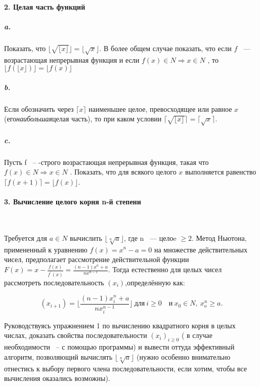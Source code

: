 \documentclass{mai_book}
\begin{document}
\newpage



\paragraph { 2. Целая часть функций}

\subparagraph { a.} Показать, что $\lfloor\sqrt{\lfloor {x }\rfloor}\rfloor=
\lfloor\sqrt{x}\rfloor$. В более общем случае показать, что если $f$ ~--- возрастающая непрерывная функция и если $f\left(x\right)\in{ N }\Rightarrow {x\in {N}}$ , то $\lfloor {f\left(\lfloor {x}\rfloor\right)}\rfloor=\lfloor{ f\left({x}\right)}\rfloor$

\subparagraph { b.} Если обозначить через $\lceil{x}\rceil$ наименьшее целое, превосходящее или равное $x$ (его{\it наибольшая}целая часть), то при каком условии $\lceil{\sqrt{\lfloor {x}\rfloor}}\rceil=\lceil{\sqrt{x}}\rceil$.

\subparagraph { c.} Пусть f ~-- -строго возрастающая непрерывная функция, такая что $f\left(x\right)\in{ N }\Rightarrow {x\in {N}}$ . Показать, что для всякого целого $x$ выполняется равенство $\lceil{f\left({x+1}\right)}\rceil=\lfloor{f\left({x}\right)}\rfloor$. 

\paragraph { 3. Вычисление целого корня n-й степени}\ \newline

Требуется для $a\in{N}$ вычислить $\lfloor{\sqrt[n]{a}}\rfloor$, где n ~--- целоe $ \geqslant{2}$. Метод Ньютона, примененный к уравнению $f\left({x}\right)=x^{n}-a=0$ на множестве действительных чисел, предполагает рассмотрение действительной функции $F\left({x}\right)=x-\frac{f\left({x}\right)}{f^\prime\left({x}\right)}= \frac{\left({n-1}\right)x^{n}+a}{nx^{n-1}}$. Тогда естественно для целых чисел рассмотреть последовательность $\left({x_{i}}\right)$,определённую как:

\begin{equation*}
\left({x_{i+1}}\right)=\lfloor\frac{\left({n-1}\right)x_i^n+a}{nx_i^{n-1}}\rfloor ~\text{для}~ i\geqslant{0}\quad\text{и}~ x_{0}\in{N}, ~x_o^n\geqslant{a}.
\end{equation*}

Руководствуясь упражнением 1 по вычислению квадратного корня в целых числах, доказать свойства последовательности $\left({x_{i}}\right)_{i\geqslant{0}}$ ( в случае необходимости ~-- с помощью программы) и вывести оттуда эффективный алгоритм, позволяющий вычислять $\lfloor\sqrt[n]{a}\rfloor$ (нужно особенно внимательно отнестись к выбору первого члена последовательности, если хотим, чтобы все вычисления оказались возможны). 
\end{document}
